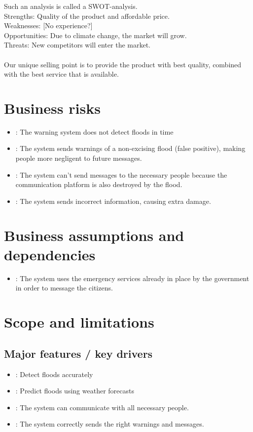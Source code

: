 Such an analysis is called a SWOT-analysis. 
\\
Strengths: Quality of the product and affordable price.\\ %
Weaknesses: [No experience?]\\
Opportunities: Due to climate change, the market will grow. \\
Threats: New competitors will enter the market.\\\\

Our unique selling point is to provide the product with best quality, combined with the best service that is available.

\section{Business risks}
\begin{itemize}
	\item {}: The warning system does not detect floods in time
	\item {}: The system sends warnings of a non-excising flood (false positive), making people more negligent to future messages.
	\item {}: The system can't send messages to the necessary people because the communication platform is also destroyed by the flood.
	\item {}: The system sends incorrect information, causing extra damage.
\end{itemize}

\section{Business assumptions and dependencies}
\begin{itemize}
	\item {}: The system uses the emergency services already in place by the government in order to message the citizens.
	
\end{itemize}

\section{Scope and limitations}
\subsection{Major features / key drivers}
\begin{itemize}
	\item {}: Detect floods accurately
	\item {}: Predict floods using weather forecasts
	\item {}: The system can communicate with all necessary people.
	\item {}: The system correctly sends the right warnings and messages.
		
\end{itemize}
